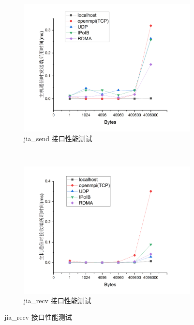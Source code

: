 {    \begin{figure}[!htbp]
        \centering
        \begin{subfigure}[b]{0.8\textwidth}
            \includegraphics[width=1.0\textwidth]{Img/send_perf.png}
            \caption{jia\_send 接口性能测试}
            \label{fig:test-send}
        \end{subfigure}
        ~ %
        \begin{subfigure}[b]{0.8\textwidth}
            \includegraphics[width=1.0\textwidth]{Img/recv_perf.png}
            \caption{jia\_recv 接口性能测试}
            \label{fig:test-recv}
        \end{subfigure}
        \label{fig:test-mpi}
    \end{figure}

}
